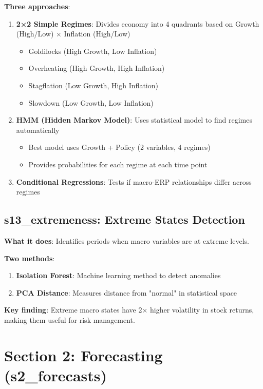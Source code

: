 \documentclass[11pt,a4paper]{article}
\begin{document}
\textbf{Three approaches}:
\begin{enumerate}
    \item \textbf{2×2 Simple Regimes}: Divides economy into 4 quadrants based on Growth (High/Low) × Inflation (High/Low)
    \begin{itemize}
        \item Goldilocks (High Growth, Low Inflation)
        \item Overheating (High Growth, High Inflation)
        \item Stagflation (Low Growth, High Inflation)
        \item Slowdown (Low Growth, Low Inflation)
    \end{itemize}
    
    \item \textbf{HMM (Hidden Markov Model)}: Uses statistical model to find regimes automatically
    \begin{itemize}
        \item Best model uses Growth + Policy (2 variables, 4 regimes)
        \item Provides probabilities for each regime at each time point
    \end{itemize}
    
    \item \textbf{Conditional Regressions}: Tests if macro-ERP relationships differ across regimes
\end{enumerate}

\subsection{s13\_extremeness: Extreme States Detection}
\textbf{What it does}: Identifies periods when macro variables are at extreme levels.

\textbf{Two methods}:
\begin{enumerate}
    \item \textbf{Isolation Forest}: Machine learning method to detect anomalies
    \item \textbf{PCA Distance}: Measures distance from "normal" in statistical space
\end{enumerate}

\textbf{Key finding}: Extreme macro states have 2× higher volatility in stock returns, making them useful for risk management.

\section{Section 2: Forecasting (s2\_forecasts)}
\end{document}

